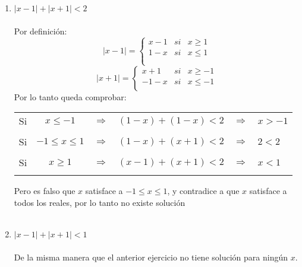 \begin{enumerate}[\bfseries 1.]
\begin{enumerate}[\bfseries (i)]
\item $|x-1|+|x+1|<2$\\\\
Por definición:
\begin{equation}
|x-1| = \left\lbrace
\begin{array}{rcr}
  x-1& si & x\geq 1\\
 1-x& si & x \leq 1\\\\
\end{array}
\right.
\end{equation}
\begin{equation}
|x+1| = \left\lbrace
\begin{array}{rcr}
  x+1& si & x\geq -1\\
 -1-x& si & x \leq -1\\
\end{array}
\right.
\end{equation}
Por lo tanto queda comprobar:\\
\begin{center}
\begin{tabular}{c c c r c l}
Si&$x\leq -1$&$\Rightarrow$&$(1-x)+(1-x)<2$&$\Rightarrow$&$x>-1$\\\\
Si&$-1\leq x \leq 1$&$\Rightarrow$&$(1-x)+(x+1)<2$&$\Rightarrow$&$2<2$\\\\
Si&$x\geq 1$&$\Rightarrow$&$(x-1)+(x+1)<2$&$\Rightarrow$&$x<1$\\\\
\end{tabular}
\end{center}
Pero es falso que $x$ satisface a $-1\leq x \leq 1$, y contradice a que $x$ satisface a todos los reales, por lo tanto no existe solución\\\\ 

\item $|x-1|+|x+1|<1$ \\\\ De la misma manera que el anterior ejercicio no tiene solución para ningún $x$.\\\\


\end{enumerate}
\end{enumerate}
